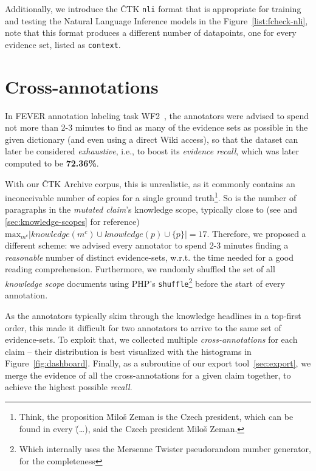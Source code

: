 Additionally, we introduce the \textsf{ČTK} \texttt{nli} format that is appropriate for training and testing the Natural Language Inference models in the Figure~\ref{list:fcheck-nli}, note that this format produces a different number of datapoints, one for every evidence set, listed as \texttt{context}.



\section{Cross-annotations}
\label{sec:cross-annotations}
In \textsf{FEVER} annotation labeling task \textsf{WF2}~\cite{fever}, the annotators were advised to spend not more than 2-3 minutes to find as many of the evidence sets as possible in the given dictionary (and even using a direct \textsf{Wiki} access), so that the dataset can later be considered \textit{exhaustive}, i.e., to boost its \textit{evidence recall}, which was later computed to be \textbf{72.36\%}.

With our \textsf{ČTK Archive} corpus, this is unrealistic, as it commonly contains an inconceivable number of copies for a single ground truth\footnote{Think, the proposition \"{Miloš Zeman is the Czech president}, which can be found in every \"{(\dots), said the Czech president Miloš Zeman.}}. So is the number of paragraphs in the \textit{mutated claim}'s knowledge scope, typically close to (see \tjednab{} and \ref{sec:knowledge-scopes} for reference) $\text{max}_{m^c}|knowledge(m^c)\cup knowledge(p) \cup\{p\}|=17$. Therefore, we proposed a different scheme: we advised every annotator to spend 2-3 minutes finding a \textit{reasonable} number of distinct evidence-sets, w.r.t. the time needed for a good reading comprehension. Furthermore, we randomly shuffled the set of all \textit{knowledge scope} documents using \textsf{PHP}'s \texttt{shuffle}\footnote{Which internally uses the Mersenne Twister pseudorandom number generator, for the completeness} before the start of every \tdva{} annotation.

As the annotators typically skim through the knowledge headlines in a top-first order, this made it difficult for two annotators to arrive to the same set of evidence-sets. To exploit that, we collected multiple \textit{cross-annotations} for each claim -- their distribution is best visualized with the histograms in Figure~\ref{fig:dashboard}. Finally, as a subroutine of our export tool~\ref{sec:export}, we merge the evidence of all the cross-annotations for a given claim together, to achieve the highest possible \textit{recall}.


